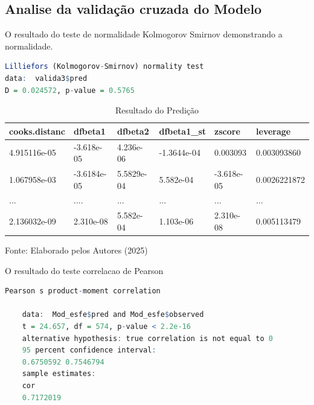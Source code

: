  \subsection{Analise da validação cruzada do Modelo }
 
\hspace*{1.25 cm}  O resultado do teste  de normalidade Kolmogorov Smirnov demonstrando a normalidade.
 
   \lstset{
 	language=R, %
 	caption= Resultado do Teste Lilliefors (Kolmogorov\_Smirnov) R,} %
 \begin{lstlisting}[language=R]
	Lilliefors (Kolmogorov-Smirnov) normality test
data:  valida3$pred
D = 0.024572, p-value = 0.5765 \end{lstlisting} 
 \begin{table}[h!t]
	\centering
	\begin{threeparttable}
		\caption{Resultado do Predição }
		\label{Tabela-entrada-avalia-modelo}
		\begin{tabular}{ l l l l ll}
			\toprule
				cooks.distanc&dfbeta1&	dfbeta2&	dfbeta1\_st&	zscore&	leverage	 \\\midrule
	4.915116e-05	&-3.618e-05	&4.236e-06&-1.3644e-04&0.003093&0.003093860	 \\ 
	1.067958e-03	&	-3.6184e-05&5.5829e-04	&	5.582e-04&	-3.618e-05&0.0026221872 \\ 
			...&	....&	...&	...&...&... \\ 
	2.136032e-09	&2.310e-08	&	5.582e-04	&1.103e-06&2.310e-08&0.005113479 \\ 
			\bottomrule
		\end{tabular}%
		\begin{tablenotes}
			\item [{\normalsize Fonte:     Elaborado pelos Autores (2025)}]  
		\end{tablenotes}
	\end{threeparttable}
\end{table}

\hspace*{1.25 cm}  O resultado do teste correlacao de Pearson
   \lstset{
 	language=R, %
 	caption= Resultado do Teste de Correlação em linguagem R,} %
 \begin{lstlisting}[language=R]	
 	Pearson s product-moment correlation
 	
 	data:  Mod_esfe$pred and Mod_esfe$observed
 	t = 24.657, df = 574, p-value < 2.2e-16
 	alternative hypothesis: true correlation is not equal to 0
 	95 percent confidence interval:
 	0.6750592 0.7546794
 	sample estimates:
 	cor 
 	0.7172019  \end{lstlisting}   
 

